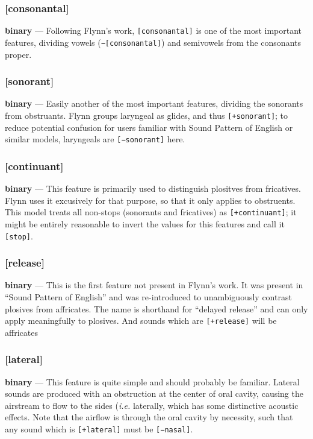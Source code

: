 \documentclass[10pt,letterpaper]{article}
\begin{document}
\subsubsection{[consonantal]}
\label{ssub:feature_consonantal}
\textbf{binary} — Following Flynn's work, \texttt{[consonantal]} is one of the most important features, dividing vowels (\texttt{−[consonantal]}) and semivowels from the consonants proper.

\subsubsection{[sonorant]}
\label{ssub:feature_sonorant}
\textbf{binary} — Easily another of the most important features, dividing the sonorants from obstruants. Flynn groups laryngeal as glides, and thus \texttt{[+sonorant]}; to reduce potential confusion for users familiar with Sound Pattern of English or similar models, laryngeals are \texttt{[−sonorant]} here.

\subsubsection{[continuant]}
\label{ssub:feature_continuant}
\textbf{binary} — This feature is primarily used to distinguish plositves from fricatives. Flynn uses it excusively for that purpose, so that it only applies to obstruents. This model treats all non-stops (sonorants and fricatives) as \texttt{[+continuant]}; it might be entirely reasonable to invert the values for this features and call it \texttt{[stop]}.

\subsubsection{[release]}
\label{ssub:feature_release}
\textbf{binary} — This is the first feature not present in Flynn's work. It was present in ``Sound Pattern of English'' and was re-introduced to unambiguously contrast plosives from affricates. The name is shorthand for ``delayed release'' and can only apply meaningfully to plosives. And sounds which are \texttt{[+release]} will be affricates

\subsubsection{[lateral]}
\label{ssub:feature_lateral}
\textbf{binary} — This feature is quite simple and should probably be familiar. Lateral sounds are produced with an obstruction at the center of oral cavity, causing the airstream to flow to the sides (\emph{i.e.} laterally, which has some distinctive acoustic effects. Note that the airflow is through the oral cavity by necessity, such that any sound which is \texttt{[+lateral]} must be \texttt{[−nasal]}.
\end{document}
